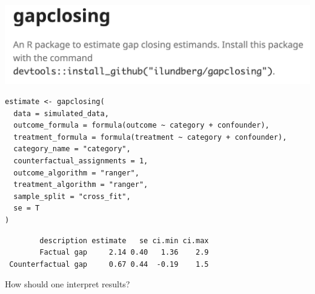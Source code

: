 \documentclass{beamer}
\begin{document}
{\begin{frame}
\end{frame}

\begin{frame}[t,fragile]
\includegraphics[width = .8\textwidth]{figures/gapclosing_package}

\begin{scriptsize}
\begin{verbatim}
estimate <- gapclosing(
  data = simulated_data,
  outcome_formula = formula(outcome ~ category + confounder),
  treatment_formula = formula(treatment ~ category + confounder),
  category_name = "category",
  counterfactual_assignments = 1,
  outcome_algorithm = "ranger",
  treatment_algorithm = "ranger",
  sample_split = "cross_fit",
  se = T
)
\end{verbatim}

\begin{verbatim}
        description estimate   se ci.min ci.max
        Factual gap     2.14 0.40   1.36    2.9
 Counterfactual gap     0.67 0.44  -0.19    1.5
 \end{verbatim}
 \end{scriptsize}
\end{frame}

\begin{frame}
How should one interpret results?
\end{frame}

}
\end{document}
